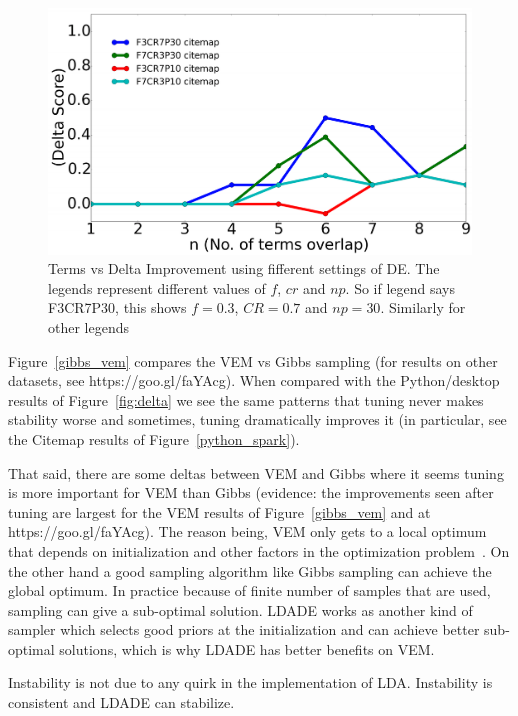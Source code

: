 \documentclass[twocolumn,5p,sort&compress]{elsarticle}
\theoremstyle{break}
\begin{document}
\begin{figure}[!t]
  \includegraphics[width=\linewidth]{./fig/citemap.png}
  \caption{Terms vs Delta Improvement using fifferent settings of DE. The legends represent different values of $f$, $cr$ and $np$. So if legend says F3CR7P30, this shows $f=0.3$, $CR=0.7$ and $np=30$. Similarly for other legends}
  \label{fig:RQ4}
  \vspace{-0.3cm}
\end{figure}

  Figure~\ref{gibbs_vem} compares the  VEM vs Gibbs sampling (for results on other datasets, see https://goo.gl/faYAcg). When compared with the Python/desktop results of
   Figure~\ref{fig:delta} we see the same patterns that tuning never makes stability worse and sometimes, tuning dramatically improves it (in particular, see the Citemap results
   of  Figure~\ref{python_spark}).

   That said, there are some deltas between VEM and Gibbs where it seems tuning
   is more important for VEM than Gibbs (evidence: the improvements seen after
   tuning are largest for the  VEM results of  Figure~\ref{gibbs_vem} and at  https://goo.gl/faYAcg). The reason being, VEM only gets to a local optimum that depends on initialization and other factors in the optimization problem~\cite{asuncion2009smoothing}. On the other hand a good sampling algorithm like Gibbs sampling can achieve the global optimum. In practice because of finite number of samples that are used, sampling can give a sub-optimal solution. LDADE works as another kind of sampler which selects good priors at the initialization and can achieve better sub-optimal solutions, which is why LDADE has better benefits on VEM.

\begin{lesson}
  Instability is not due to any quirk in the implementation of LDA. Instability is consistent and LDADE can stabilize. 
\end{lesson}
\end{document}
